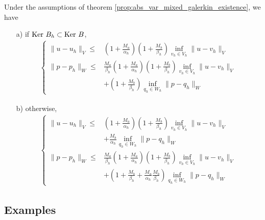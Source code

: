 \begin{lemma}
  Under the assumptions of theorem \ref{prop:abs_var_mixed_galerkin_existence}, we have
  \begin{itemize}
    \item[a)] if $\mbox{Ker}~ B_h \subset \mbox{Ker}~ B$,
      \begin{align}
        \left\{ 
        \begin{array}{cl}
          \|u -u_h\|_V  \leq & \left( 1+\frac{ M_a}{\alpha_h} \right) \left( 1+\frac{ M_b}{\beta_h} \right) \inf\limits_{v_h \in V_h} \| u-v_h \|_{V}
          \\
          \|p -p_h\|_W  \leq & \frac{ M_a}{\beta_h} \left( 1+\frac{ M_a}{\alpha_h} \right) \left( 1+\frac{ M_b}{\beta_h} \right) \inf\limits_{v_h \in V_h} \| u-v_h \|_{V}
          \\
          & + \left( 1+\frac{ M_b}{\beta_h} \right) \inf\limits_{q_h \in W_h} \| p-q_h \|_{W}
        \end{array} \right.
      \end{align}

    \item[b)] otherwise,
      \begin{align}
        \left\{ 
        \begin{array}{cl}
          \|u -u_h\|_V  \leq & \left( 1+\frac{ M_a}{\alpha_h} \right) \left( 1+\frac{ M_b}{\beta_h} \right) \inf\limits_{v_h \in V_h} \| u-v_h \|_{V}
          \\
          & + \frac{ M_b}{\alpha_h} \inf\limits_{q_h \in W_h} \| p-q_h \|_{W}
          \\
          \|p -p_h\|_W  \leq & \frac{ M_a}{\beta_h} \left( 1+\frac{ M_a}{\alpha_h} \right) \left( 1+\frac{ M_b}{\beta_h} \right) \inf\limits_{v_h \in V_h} \| u-v_h \|_{V}
          \\
          & + \left( 1+\frac{ M_b}{\beta_h} + \frac{ M_a}{\alpha_h}\frac{ M_b}{\beta_h}  \right) \inf\limits_{q_h \in W_h} \| p-q_h \|_{W}
        \end{array} \right.
      \end{align}

  \end{itemize}
  
\end{lemma}


\subsection{Examples}

